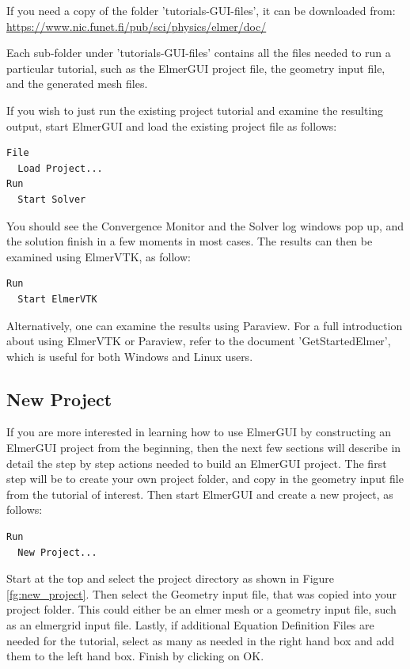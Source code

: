If you need a copy of the folder 'tutorials-GUI-files', it can be downloaded from:  \url{https://www.nic.funet.fi/pub/sci/physics/elmer/doc/}

Each sub-folder under 'tutorials-GUI-files' contains all the files needed to run a particular tutorial, such as the ElmerGUI project file, the geometry input file, and the generated mesh files.  

If you wish to just run the existing project tutorial and examine the resulting output, start ElmerGUI and load the existing project file as follows:

\begin{verbatim}
File
  Load Project...
Run
  Start Solver
\end{verbatim}

You should see the Convergence Monitor and the Solver log windows pop up, and the solution finish in a few moments in most cases.  The results can then be examined using ElmerVTK, as follow:

\begin{verbatim}
Run
  Start ElmerVTK
\end{verbatim}

Alternatively, one can examine the results using Paraview.  For a full introduction about using ElmerVTK or Paraview, refer to the document 'GetStartedElmer', which is useful for both Windows and Linux users.

\subsection*{New Project}

If you are more interested in learning how to use ElmerGUI by constructing an ElmerGUI project from the beginning, then the next few sections will describe in detail the step by step actions needed to build an ElmerGUI project.  The first step will be to create your own project folder, and copy in the geometry input file from the tutorial of interest.  Then start ElmerGUI and create a new project, as follows:

\begin{verbatim}
Run
  New Project...
\end{verbatim}

Start at the top and select the project directory as shown in Figure \ref{fg:new_project}.  Then select the Geometry input file, that was copied into your project folder.  This could either be an elmer mesh or a geometry input file, such as an elmergrid input file.  Lastly, if additional Equation Definition Files are needed for the tutorial, select as many as needed in the right hand box and add them to the left hand box.  Finish by clicking on OK.

